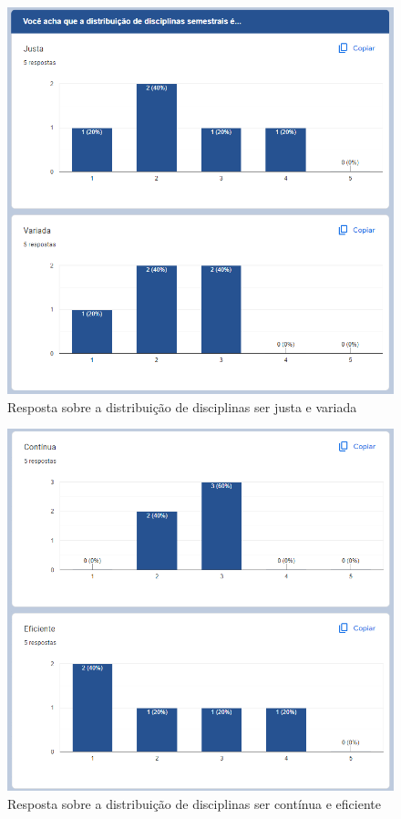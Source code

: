         \begin{figure}[htbp]\centering
            \caption{\label{fig:5.1_Opiniao} Resposta sobre a distribuição de disciplinas ser justa e variada}
            \includegraphics[scale=0.8]{files/img/forms/5.1-Opiniao-JustaVariada.png}
        \end{figure} %
        \begin{figure}[htbp]\centering
            \caption{\label{fig:5.2_Opiniao} Resposta sobre a distribuição de disciplinas ser contínua e eficiente}
            \includegraphics[scale=0.8]{files/img/forms/5.2-Opiniao-ContinuaEficiente.png}
        \end{figure} %
